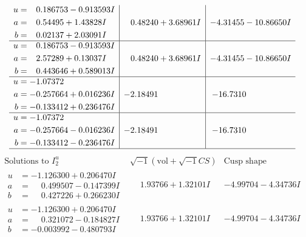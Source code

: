 \documentclass[1p]{elsarticle_modified}
\theoremstyle{definition}
\newcommand{\I}{\sqrt{-1}}
\begin{document}
$$\begin{array}{c|c|c}
\begin{aligned}
u &= \phantom{-}0.186753 - 0.913593 I \\
a &= \phantom{-}0.54495 + 1.43828 I \\
b &= \phantom{-}0.02137 + 2.03091 I\end{aligned}
 & \phantom{-}0.48240 + 3.68961 I & -4.31455 - 10.86650 I \\ \hline\begin{aligned}
u &= \phantom{-}0.186753 - 0.913593 I \\
a &= \phantom{-}2.57289 + 0.13037 I \\
b &= \phantom{-}0.443646 + 0.589013 I\end{aligned}
 & \phantom{-}0.48240 + 3.68961 I & -4.31455 - 10.86650 I \\ \hline\begin{aligned}
u &= -1.07372\phantom{ +0.000000I} \\
a &= -0.257664 + 0.016236 I \\
b &= -0.133412 + 0.236476 I\end{aligned}
 & -2.18491\phantom{ +0.000000I} & -16.7310\phantom{ +0.000000I} \\ \hline\begin{aligned}
u &= -1.07372\phantom{ +0.000000I} \\
a &= -0.257664 - 0.016236 I \\
b &= -0.133412 - 0.236476 I\end{aligned}
 & -2.18491\phantom{ +0.000000I} & -16.7310\phantom{ +0.000000I}\\
 \hline 
 \end{array}$$\newpage$$\begin{array}{c|c|c}  
\text{Solutions to }I^u_{2}& \I (\text{vol} + \sqrt{-1}CS) & \text{Cusp shape}\\
 \hline 
\begin{aligned}
u &= -1.126300 + 0.206470 I \\
a &= \phantom{-}0.499507 - 0.147399 I \\
b &= \phantom{-}0.427226 + 0.266230 I\end{aligned}
 & \phantom{-}1.93766 + 1.32101 I & -4.99704 - 4.34736 I \\ \hline\begin{aligned}
u &= -1.126300 + 0.206470 I \\
a &= \phantom{-}0.321072 - 0.184827 I \\
b &= -0.003992 - 0.480793 I\end{aligned}
 & \phantom{-}1.93766 + 1.32101 I & -4.99704 - 4.34736 I \\ \hline\begin{aligned}

\end{aligned}
\end{array}$$
\end{document}
